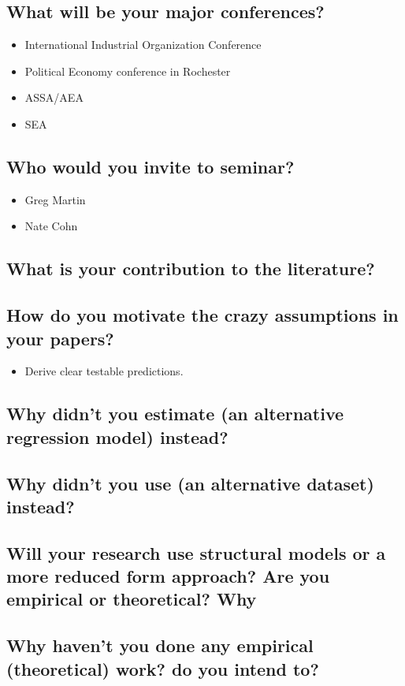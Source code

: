\documentclass[12pt]{article}
\theoremstyle{plain}
\theoremstyle{plain}
\theoremstyle{plain}
\theoremstyle{plain}
\theoremstyle{plain}
\theoremstyle{plain}
\begin{document}
\subsection{What will be your major conferences?}
\label{sec:org32a6382}
\begin{itemize}
\item International Industrial Organization Conference
\item Political Economy conference in Rochester
\item ASSA/AEA
\item SEA
\end{itemize}
\subsection{Who would you invite to seminar?}
\label{sec:org6f444d0}
\begin{itemize}
\item Greg Martin
\item Nate Cohn
\end{itemize}
\subsection{What is your contribution to the literature?}
\label{sec:orge517277}
\subsection{How do you motivate the crazy assumptions in your papers?}
\label{sec:orge4dfcc9}
\begin{itemize}
\item Derive clear testable predictions.
\end{itemize}
\subsection{Why didn't you estimate (an alternative regression model) instead?}
\label{sec:orgee851ec}
\subsection{Why didn't you use (an alternative dataset) instead?}
\label{sec:org30bcf7a}
\subsection{Will your research use structural models or a more reduced form approach? Are you empirical or theoretical? Why}
\label{sec:org126e3e2}
\subsection{Why haven't you done any empirical (theoretical) work? do you intend to?}
\label{sec:orge3ba087}
\end{document}
